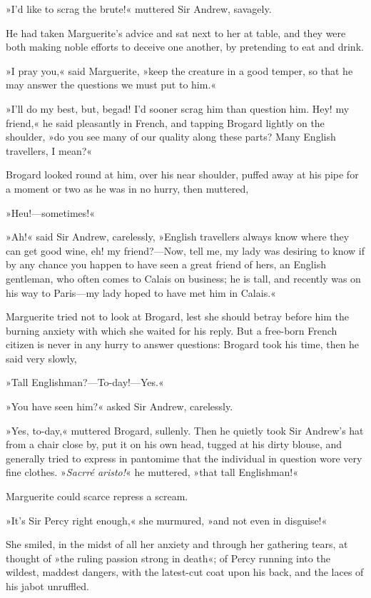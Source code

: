 »I'd like to scrag the brute!« muttered Sir Andrew, savagely.

He had taken Marguerite's advice and sat next to her at table, and they were both making noble efforts to deceive one another, by pretending to eat and drink.

»I pray you,« said Marguerite, »keep the creature in a good temper, so that he may answer the questions we must put to him.«

»I'll do my best, but, begad! I'd sooner scrag him than question him. Hey! my friend,« he said pleasantly in French, and tapping Brogard lightly on the shoulder, »do you see many of our quality along these parts? Many English travellers, I mean?«

Brogard looked round at him, over his near shoulder, puffed away at his pipe for a moment or two as he was in no hurry, then muttered,\longdash


»Heu!\allowbreak---\allowbreak sometimes!«

»Ah!« said Sir Andrew, carelessly, »English travellers always know where they can get good wine, eh! my friend?\allowbreak---\allowbreak Now, tell me, my lady was desiring to know if by any chance you happen to have seen a great friend of hers, an English gentleman, who often comes to Calais on business; he is tall, and recently was on his way to Paris\allowbreak---\allowbreak my lady hoped to have met him in Calais.«

Marguerite tried not to look at Brogard, lest she should betray before him the burning anxiety with which she waited for his reply. But a free-born French citizen is never in any hurry to answer questions: Brogard took his time, then he said very slowly,\longdash


»Tall Englishman?\allowbreak---\allowbreak To-day!\allowbreak---\allowbreak Yes.«

»You have seen him?« asked Sir Andrew, carelessly.

»Yes, to-day,« muttered Brogard, sullenly. Then he quietly took Sir Andrew's hat from a chair close by, put it on his own head, tugged at his dirty blouse, and generally tried to express in pantomime that the individual in question wore very fine clothes. »\textit{Sacrré aristo!}« he muttered, »that tall Englishman!«

Marguerite could scarce repress a scream.

»It's Sir Percy right enough,« she murmured, »and not even in disguise!«

She smiled, in the midst of all her anxiety and through her gathering tears, at thought of »the ruling passion strong in death«; of Percy running into the wildest, maddest dangers, with the latest-cut coat upon his back, and the laces of his jabot unruffled.

